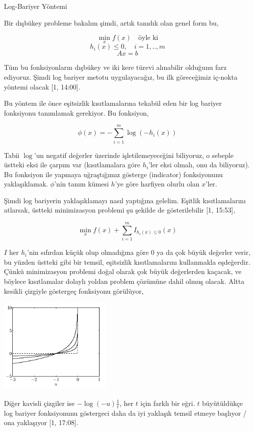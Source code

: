 \documentclass[12pt,fleqn]{article}\usepackage{../../common}
\begin{document}
Log-Bariyer Yöntemi

Bir dışbükey probleme bakalım şimdi, artık tanıdık olan genel form bu,

$$
\min_x f(x) \quad \textrm{öyle ki}
$$
$$
h_i(x) \le 0, \quad i=1,..,m
$$
$$
Ax = b
$$

Tüm bu fonksiyonların dışbükey ve iki kere türevi alınabilir olduğunu farz
ediyoruz. Şimdi log bariyer metotu uygulayacağız, bu ilk göreceğimiz
iç-nokta yöntemi olacak [1, 14:00]. 

Bu yöntem ile önce eşitsizlik kısıtlamalarına tekabül eden bir log bariyer
fonksiyonu tanımlamak gerekiyor. Bu fonksiyon, 

$$
\phi(x) = -\sum_{i=1}^{m} \log(-h_i(x))
$$

Tabii $\log$'un negatif değerler üzerinde işletilemeyeceğini biliyoruz, o
sebeple üstteki eksi ile çarpım var (kısıtlamalara göre $h_i$'ler eksi
olmalı, onu da biliyoruz). Bu fonksiyon ile yapmaya uğraştığımız gösterge
(indicator) fonksiyonunu yaklaşıklamak. $\phi$'nin tanım kümesi $h$'ye göre
harfiyen olurlu olan $x$'ler. 

Şimdi log bariyerin yaklaşıklamayı nasıl yaptığına gelelim. Eşitlik
kısıtlamalarını atlarsak, üstteki minimizasyon problemi şu şekilde de
gösterilebilir [1, 15:53],

$$
\min_x f(x) + \sum_{i=1}^{m} I_{h_i(x) \le 0}(x)
$$

$I$ her $h_i$'nin sıfırdan küçük olup olmadığına göre 0 ya da çok büyük
değerler verir, bu yüzden üstteki gibi bir temsil, eşitsizlik
kısıtlamalarını kullanmakla eşdeğerdir. Çünkü minimizasyon problemi doğal
olarak çok büyük değerlerden kaçacak, ve böylece kısıtlamalar dolaylı
yoldan problem çözümüne dahil olmuş olacak. Altta kesikli çizgiyle
göstergeç fonksiyonu görülüyor, 

\includegraphics[width=15em]{func_59_barr_01.png}

Diğer kavisli çizgiler ise $-\log(-u) \frac{1}{t}$, her $t$ için farklı bir
eğri. $t$ büyütüldükçe log bariyer fonksiyonunu göstergeci daha da iyi
yaklaşık temsil etmeye başlıyor / ona yaklaşıyor [1, 17:08]. 
\end{document}
